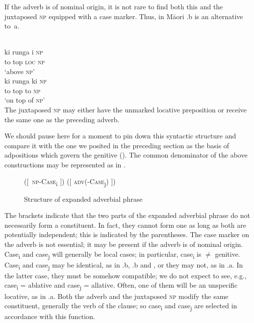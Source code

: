 If the adverb is of nominal origin, it is not rare to find both this and the juxtaposed \textsc{np} equipped with a case marker. Thus, in M\=aori .b is an alternative to~a.

\ea\label{ex:E67}
 \\
 \ea
 \gll ki  runga  i  \textsc{np}  \\
  to  top  \textsc{loc}  \textsc{np} \\
\glt ‘above \textsc{np}’\\
\ex
\gll ki  runga  ki  \textsc{np}  \\
  to  top to  \textsc{np} \\
  \glt ‘on top of \textsc{np}’\\
\z
\z
\noindent The juxtaposed \textsc{np} may either have the unmarked locative preposition or receive the same one as the preceding adverb.

We should pause here for a moment to pin down this syntactic structure and compare it with the one we posited in the preceding section as the basis of adpositions which govern the genitive (). The common denominator of the above constructions may be represented as in .

\begin{figure}
([~\textsc{np}-\textsc{Case}\textsubscript{i} ])  ([ \textsc{adv}(-\textsc{Case}\textsubscript{j}) ])
\caption{Structure of expanded adverbial phrase}\label{ex:F5}
\end{figure}

\noindent The brackets indicate that the two parts of the expanded adverbial phrase do not necessarily form a constituent. In fact, they cannot form one as long as both are potentially independent; this is indicated by the parentheses. The case marker on the adverb is not essential; it may be present if the adverb is of nominal origin. Case\textsubscript{i} and case\textsubscript{j} will generally be local cases; in particular, case\textsubscript{i} is ${\neq}$ genitive. Case\textsubscript{i} and case\textsubscript{j} may be identical, as in .b, .b and , or they may not, as in .a. In the latter case, they must be somehow compatible; we do not expect to see, e.g., case\textsubscript{i} = ablative and case\textsubscript{j} = allative. Often, one of them will be an unspecific locative, as in .a. Both the adverb and the juxtaposed \textsc{np} modify the same constituent, generally the verb of the clause; so case\textsubscript{i} and case\textsubscript{j} are selected in accordance with this function.


